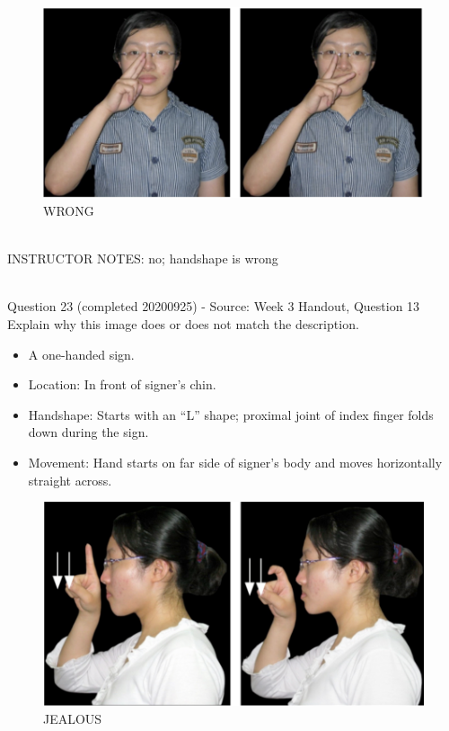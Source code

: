 \documentclass[12pt]{article}
\begin{document}
\begin{figure}[H]
\includegraphics{../images/taiwansign_wrong.png}
\caption{WRONG}
\end{figure}

~\\
INSTRUCTOR NOTES: no; handshape is wrong


~\\

{\large Question 23} (completed 20200925) - Source: Week 3 Handout, Question 13\\

Explain why this image does or does not match the description.\\

\begin{itemize} \item A one-handed sign. \item Location: In front of signer’s chin. \item Handshape: Starts with an “L” shape; proximal joint of index finger folds down during the sign. \item Movement: Hand starts on far side of signer’s body and moves horizontally straight across. \end{itemize}

\begin{figure}[H]
\includegraphics{../images/taiwansign_jealous.png}
\caption{JEALOUS}
\end{figure}
\end{document}
